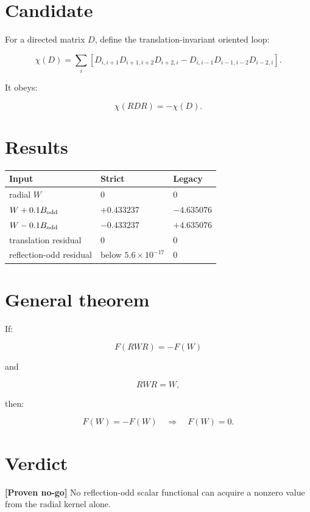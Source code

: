 \documentclass[11pt,a4paper,openany]{report}
\begin{document}
\section{Candidate}

For a directed matrix \(D\), define the translation-invariant oriented loop:

\[
\chi(D)
=
\sum_i
\left[
D_{i,i+1}D_{i+1,i+2}D_{i+2,i}
-
D_{i,i-1}D_{i-1,i-2}D_{i-2,i}
\right].
\]

It obeys:

\[
\chi(RDR)=-\chi(D).
\]

\section{Results}

\begin{center}
\begingroup\small
\setlength{\tabcolsep}{3.5pt}
\renewcommand{\arraystretch}{1.16}
\begin{longtable}{@{}p{}p{}p{}@{}}
\toprule
\textbf{Input} & \textbf{Strict} & \textbf{Legacy} \\
\midrule
\endhead
radial \(W\) & 0 & 0 \\
\(W+0.1B_{\rm odd}\) & \(+0.433237\) & \(-4.635076\) \\
\(W-0.1B_{\rm odd}\) & \(-0.433237\) & \(+4.635076\) \\
translation residual & 0 & 0 \\
reflection-odd residual & below \(5.6\times10^{-17}\) & 0 \\
\bottomrule
\end{longtable}
\endgroup
\end{center}

\section{General theorem}

If:

\[
F(RWR)=-F(W)
\]

and

\[
RWR=W,
\]

then:

\[
F(W)=-F(W)
\quad\Longrightarrow\quad
F(W)=0.
\]

\section{Verdict}

\textbf{[Proven no-go]} No reflection-odd scalar functional can acquire a nonzero value from the radial kernel alone.
\end{document}
